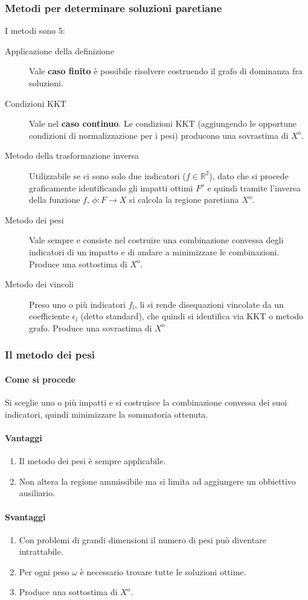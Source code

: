 \documentclass[\main/main.tex]{subfiles}
\begin{document}
\subsubsection*{Metodi per determinare soluzioni paretiane}
I metodi sono 5:
\begin{description}
  \item[Applicazione della definizione] Vale \textbf{caso finito} è possibile risolvere costruendo il grafo di dominanza fra soluzioni.
  \item[Condizioni KKT] Vale nel \textbf{caso continuo}. Le condizioni KKT (aggiungendo le opportune condizioni di normalizzazione per i pesi) producono una sovrastima di $X^o$.
  \item[Metodo della trasformazione inversa] Utilizzabile se ci sono solo due indicatori ($f \in \mathbb{R}^2 $), dato che si procede graficamente identificando gli impatti ottimi $F^o$ e quindi tramite l'inversa della funzione $f$, $\phi: F \rightarrow X$ si calcola la regione paretiana $X^o$.
  \item[Metodo dei pesi] Vale sempre e consiste nel costruire una combinazione convessa degli indicatori di un impatto e di andare a minimizzare le combinazioni. Produce una sottostima di $X^o$.
  \item[Metodo dei vincoli] Preso uno o più indicatori $f_l$, li si rende disequazioni vincolate da un coefficiente $\epsilon_l$ (detto standard), che quindi si identifica via KKT o metodo grafo. Produce una sovrastima di $X^o$
\end{description}

\subsubsection*{Il metodo dei pesi}
\paragraph*{Come si procede}
Si sceglie uno o più impatti e si costruisce la combinazione convessa dei suoi indicatori, quindi minimizzare la sommatoria ottenuta.

\paragraph*{Vantaggi}
\begin{enumerate}
  \item Il metodo dei pesi è sempre applicabile.
  \item Non altera la regione ammissibile ma si limita ad aggiungere un obbiettivo ausiliario.
\end{enumerate}

\paragraph*{Svantaggi}
\begin{enumerate}
  \item Con problemi di grandi dimensioni il numero di pesi può diventare intrattabile.
  \item Per ogni peso $\omega$ è necessario trovare tutte le soluzioni ottime.
  \item Produce una sottostima di $X^o$.
\end{enumerate}
\end{document}
